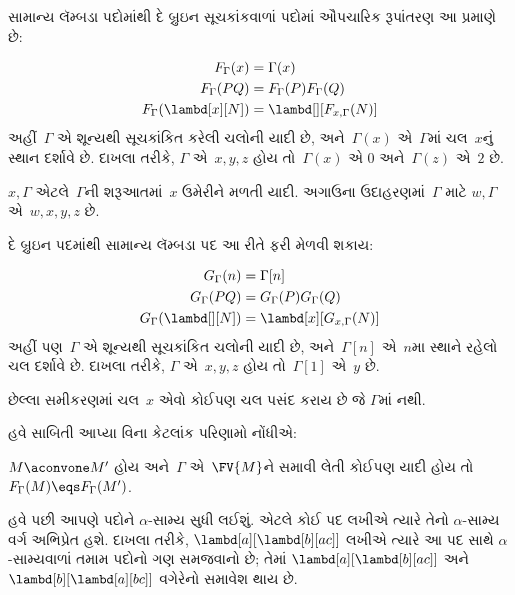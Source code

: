 સામાન્ય લૅમ્બડા પદોમાંથી દે બ્રુઇન સૂચકાંકવાળાં પદોમાં
ઔપચારિક રૂપાંતરણ આ પ્રમાણે છે:
\begin{defn}
  \begin{align*}
    F_\Gamma(x) &= \Gamma(x) \\
    F_\Gamma(PQ) &= F_\Gamma(P)F_\Gamma(Q) \\
    F_\Gamma(\lambd[x][N]) &= \lambd[][F_{x,\Gamma}(N)]
  \end{align*}
  અહીં~$\Gamma$ એ શૂન્યથી સૂચકાંકિત કરેલી ચલોની યાદી છે,
  અને~$\Gamma(x)$ એ~$\Gamma$માં ચલ~$x$નું સ્થાન દર્શાવે છે.
  દાખલા તરીકે, $\Gamma$ એ~$x,y,z$ હોય તો~$\Gamma(x)$ એ
  $0$ અને~$\Gamma(z)$ એ~$2$ છે.

  $x,\Gamma$ એટલે~$\Gamma$ની શરૂઆતમાં~$x$ ઉમેરીને મળતી
  યાદી. અગાઉના ઉદાહરણમાં~$\Gamma$ માટે
  $w,\Gamma$ એ~$w,x,y,z$ છે.
\end{defn}

દે બ્રુઇન પદમાંથી સામાન્ય લૅમ્બડા પદ આ રીતે ફરી મેળવી શકાય:

\begin{defn}
  \begin{align*}
    G_\Gamma(n) &= \Gamma[n] \\
    G_\Gamma(PQ) &= G_\Gamma(P) G_\Gamma(Q) \\
    G_\Gamma(\lambd[][N]) &= \lambd[x][G_{x,\Gamma}(N)]
  \end{align*}
  અહીં પણ~$\Gamma$ એ શૂન્યથી સૂચકાંકિત ચલોની યાદી છે,
  અને~$\Gamma[n]$ એ~$n$મા સ્થાને રહેલો ચલ દર્શાવે છે.
  દાખલા તરીકે, $\Gamma$ એ~$x,y,z$ હોય તો~$\Gamma[1]$
  એ~$y$ છે.

  છેલ્લા સમીકરણમાં ચલ~$x$ એવો કોઈપણ ચલ પસંદ કરાય છે જે
  $\Gamma$માં નથી.
\end{defn}

હવે સાબિતી આપ્યા વિના કેટલાંક પરિણામો નોંધીએ:

\begin{prop}
  $M \aconvone M'$ હોય અને~$\Gamma$ એ~$\FV{M}$ને સમાવી
  લેતી કોઈપણ યાદી હોય તો
  $F_\Gamma(M) \eqs F_\Gamma(M')$.
\end{prop}
\endgroup


\begingroup
\makeatletter{}\makeatother

\label{guunit:OLP-0364}


હવે પછી આપણે પદોને $\alpha$-સામ્ય સુધી લઈશું. એટલે કોઈ પદ
લખીએ ત્યારે તેનો $\alpha$-સામ્ય વર્ગ અભિપ્રેત હશે. દાખલા તરીકે,
$\lambd[a][\lambd[b][a c]]$ લખીએ ત્યારે આ પદ સાથે
$\alpha$-સામ્યવાળાં તમામ પદોનો ગણ સમજવાનો છે; તેમાં
$\lambd[a][\lambd[b][a c]]$ અને
$\lambd[b][\lambd[a][b c]]$ વગેરેનો સમાવેશ થાય છે.

